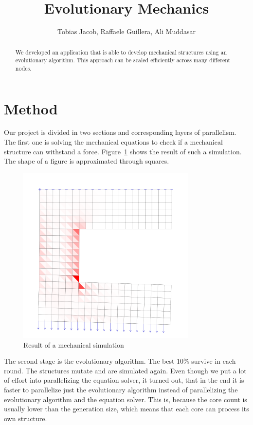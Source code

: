 \documentclass[12pt]{article}
\title{Evolutionary Mechanics}
\author{Tobias Jacob, Raffaele Guillera, Ali Muddasar}
\begin{document}
\maketitle

\begin{abstract}
    We developed an application that is able to develop mechanical structures using an evolutionary algorithm. This approach can be scaled efficiently across many different nodes.
\end{abstract}

\section{Method}

Our project is divided in two sections and corresponding layers of parallelism. The first one is solving the mechanical equations to check if a mechanical structure can withstand a force. Figure~\ref{fig:Mechanical_Simulation} shows the result of such a simulation. The shape of a figure is approximated through squares.

\begin{figure}[t]
    \centering
    \includegraphics[width=0.8\textwidth]{images/MechaincalStructure.png}
    \caption{Result of a mechanical simulation}
    \label{fig:Mechanical_Simulation}
\end{figure}


The second stage is the evolutionary algorithm. The best 10\% survive in each round. The structures mutate and are simulated again. Even though we put a lot of effort into parallelizing the equation solver, it turned out, that in the end it is faster to parallelize just the evolutionary algorithm instead of parallelizing the evolutionary algorithm and the equation solver. This is, because the core count is usually lower than the generation size, which means that each core can process its own structure. 
\end{document}
